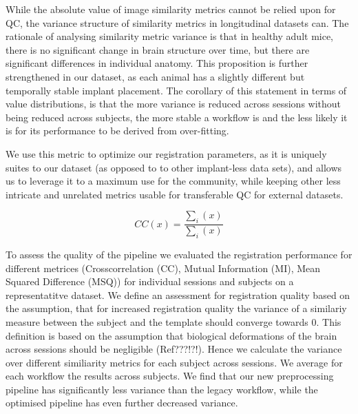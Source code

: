 While the absolute value of image similarity metrics cannot be relied upon for QC, the variance structure of similarity metrics in longitudinal datasets can.
The rationale of analysing similarity metric variance is that in healthy adult mice, there is no significant change in brain structure over time, but there are significant differences in individual anatomy.
This proposition is further strengthened in our dataset, as each animal has a slightly different but temporally stable implant placement. 
The corollary of this statement in terms of value distributions, is that the more variance is reduced across sessions without being reduced across subjects, the more stable a workflow is and the less likely it is for its performance to be derived from over-fitting.


\color{lg}
We use this metric to optimize our registration parameters, as it is uniquely suites to our dataset (as opposed to to other implant-less data sets), and allows us to leverage it to a maximum use for the community, while keeping other less intricate and unrelated metrics usable for transferable QC for external datasets.


\[ CC(x) = \frac{\sum_i{(x)}}{\sum_i{(x)}} \]


To assess the quality of the pipeline we evaluated the registration performance for different metrices (Crosscorrelation (CC), Mutual Information (MI), Mean Squared Difference (MSQ)) for individual sessions and subjects on a representatitve dataset.
We define an assessment for registration quality based on the assumption, that for increased registration quality the variance of a similariy measure between the subject and the template should converge towards 0.
This definition is based on the assumption that biological deformations of the brain across sessions should be negligible (Ref???!?!).
Hence we calculate the variance over different similiarity metrics for each subject across sessions.
We average for each workflow the results across subjects.
We find that our new preprocessing pipeline has significantly less variance than the legacy workflow, while the optimised pipeline has even further decreased variance.

